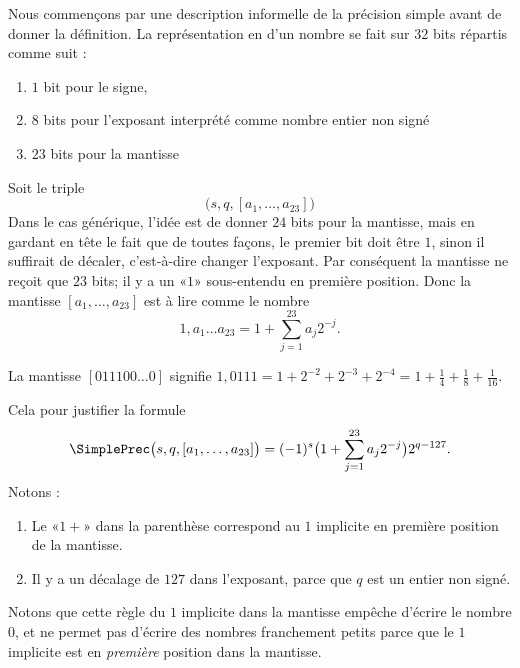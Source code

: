 Nous commençons par une description informelle de la précision simple avant de donner la définition. La représentation en  d'un nombre se fait sur \( 32\) bits répartis comme suit :
\begin{enumerate}
    \item
        \( 1\) bit pour le signe,
    \item
        \( 8\) bits pour l'exposant interprété comme nombre entier non signé
    \item
        \( 23\) bits pour la mantisse
\end{enumerate}
Soit le triple
\begin{equation}
    \big( s,q,[a_1,\ldots, a_{23}] \big)
\end{equation}
Dans le cas générique, l'idée est de donner \( 24\) bits pour la mantisse, mais en gardant en tête le fait que de toutes façons, le premier bit doit être \( 1\), sinon il suffirait de décaler, c'est-à-dire changer l'exposant. Par conséquent la mantisse ne reçoit que \( 23\) bits; il y a un «\( 1\)» sous-entendu en première position. Donc la mantisse \( [a_1,\ldots, a_{23}]\) est à lire comme le nombre
\begin{equation}
    1,a_1\ldots a_{23}=1+\sum_{j=1}^{23}a_j2^{-j}.
\end{equation}
\begin{example}
    La mantisse \( [011100\ldots 0]\) signifie \(1,0111=1+2^{-2}+2^{-3}+2^{-4}=1+\frac{1}{ 4 }+\frac{1}{ 8 }+\frac{1}{ 16 } \).
\end{example}
Cela pour justifier la formule
\begin{equation}
    \SimplePrec\big( s,q,[a_1,\ldots, a_{23}] \big)=(-1)^s\big( 1+\sum_{j=1}^{23}a_j2^{-j} \big)2^{q-127}.
\end{equation}
Notons :
\begin{enumerate}
    \item
        Le «\( 1+\)» dans la parenthèse correspond au \( 1\) implicite en première position de la mantisse.
    \item
        Il y a un décalage de \( 127\) dans l'exposant, parce que \( q\) est un entier non signé.
\end{enumerate}

Notons que cette règle du \( 1\) implicite dans la mantisse empêche d'écrire le nombre \( 0\), et ne permet pas d'écrire des nombres franchement petits parce que le \( 1\) implicite est en \emph{première} position dans la mantisse.

